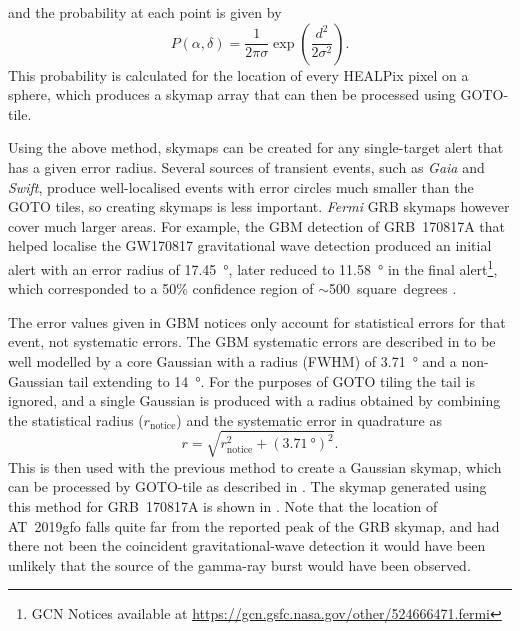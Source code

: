 \begin{colsection}
\begin{colsection}
\noindent and the probability at each point is given by
%
\begin{equation}
    P(\alpha, \delta) = \frac{1}{2\pi\sigma} \exp \left ( \frac{d^2}{2\sigma^2} \right ).
    \label{eq:gaussian_prob}
\end{equation}
%
This probability is calculated for the location of every HEALPix pixel on a sphere, which produces a skymap array that can then be processed using GOTO-tile.

Using the above method, skymaps can be created for any single-target alert that has a given error radius. Several sources of transient events, such as \textit{Gaia} and \textit{Swift}, produce well-localised events with error circles much smaller than the GOTO tiles, so creating skymaps is less important. \textit{Fermi} GRB skymaps however cover much larger areas. For example, the GBM detection of GRB~170817A that helped localise the GW170817 gravitational wave detection produced an initial alert with an error radius of \SI{17.45}{\degree}, later reduced to \SI{11.58}{\degree} in the final alert\footnote{GCN Notices available at \url{https://gcn.gsfc.nasa.gov/other/524666471.fermi}}, which corresponded to a 50\% confidence region of $\sim$500~square~degrees \citep{GW170817_Fermi}.

The error values given in GBM notices only account for statistical errors for that event, not systematic errors. The GBM systematic errors are described in \citet{Fermi_localisation} to be well modelled by a core Gaussian with a radius (FWHM) of \SI{3.71}{\degree} and a non-Gaussian tail extending to \SI{14}{\degree}. For the purposes of GOTO tiling the tail is ignored, and a single Gaussian is produced with a radius obtained by combining the statistical radius ($r_\text{notice}$) and the systematic error in quadrature as
%
\begin{equation}
    r = \sqrt{r_\text{notice}^2 + {(\SI{3.71}{\degree})}^2}.
    \label{eq:fermi_radius}
\end{equation}
%
This is then used with the previous method to create a Gaussian skymap, which can be processed by GOTO-tile as described in . The skymap generated using this method for GRB~170817A is shown in . Note that the location of AT~2019gfo falls quite far from the reported peak of the GRB skymap, and had there not been the coincident gravitational-wave detection it would have been unlikely that the source of the gamma-ray burst would have been observed.


\end{colsection}
\end{colsection}
